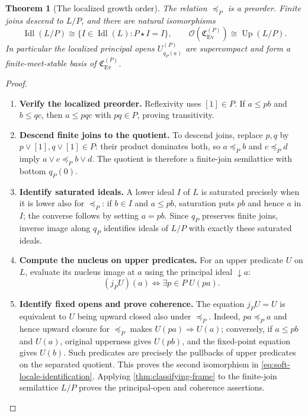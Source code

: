 \documentclass[11pt,a4paper]{article}
\numberwithin{algorithm}{section}
\numberwithin{equation}{section}
\newtheorem{theorem}{Theorem}[section]
\theoremstyle{definition}
\theoremstyle{remark}
\theoremstyle{plain}
\newcommand{\OO}{\mathcal O}
\newcommand{\Idl}{\operatorname{Idl}}
\newcommand{\Ev}{{\operatorname{Ev}}}
\newcommand{\Cplx}{\mathfrak C_{\Ev}}
\newcommand{\Up}{\operatorname{Up}}
\theoremstyle{definition}
\theoremstyle{plain}
\begin{document}
\begin{theorem}[The localized growth order]
\label{thm:localized-growth-order}
The relation $\preceq_P$ is a preorder. Finite joins descend to $L/P$,
and there are natural isomorphisms
\begin{equation}\label{eq:soft-locale-identification}
 \Idl(L/P)\cong\{I\in\Idl(L):P\star I=I\},\qquad
 \OO(\Cplx^{(P)})\cong\Up(L/P).
\end{equation}
In particular the localized principal opens
$U^{(P)}_{q_P(a)}$ are supercompact and form a
finite-meet-stable basis of $\Cplx^{(P)}$.
\end{theorem}
\begin{proof}\leavevmode
\begin{enumerate}[leftmargin=*,align=left]
\item \textbf{Verify the localized preorder.}
Reflexivity uses $[1]\in P$.  If $a\le pb$ and $b\le qc$,
then $a\le pqc$ with $pq\in P$, proving transitivity.

\item \textbf{Descend finite joins to the quotient.}
To descend joins, replace $p,q$ by $p\vee[1],q\vee[1]\in P$:
their product dominates both, so
$a\preceq_P b$ and $c\preceq_P d$ imply
$a\vee c\preceq_P b\vee d$.  The quotient is therefore a
finite-join semilattice with bottom $q_P(0)$.

\item \textbf{Identify saturated ideals.}
A lower ideal $I$ of $L$ is saturated precisely when it is
lower also for $\preceq_P$: if $b\in I$ and $a\le pb$,
saturation puts $pb$ and hence $a$ in $I$; the converse
follows by setting $a=pb$.  Since $q_P$ preserves finite
joins, inverse image along $q_P$ identifies ideals of $L/P$
with exactly these saturated ideals.

\item \textbf{Compute the nucleus on upper predicates.}
For an upper predicate $U$ on $L$, evaluate its nucleus image
at $a$ using the principal ideal $\downarrow a$:
\[
 (j_PU)(a)\iff\exists p\in P\;U(pa).
\]

\item \textbf{Identify fixed opens and prove coherence.}
The equation $j_PU=U$ is equivalent to $U$ being upward
closed also under $\preceq_P$.  Indeed, $pa\preceq_Pa$
and hence upward closure for $\preceq_P$ makes
$U(pa)\Rightarrow U(a)$; conversely, if $a\le pb$ and
$U(a)$, original upperness gives $U(pb)$, and the fixed-point
equation gives $U(b)$.  Such predicates are precisely the
pullbacks of upper predicates on the separated quotient.
This proves the second isomorphism in
\eqref{eq:soft-locale-identification}.  Applying
\cref{thm:classifying-frame} to the finite-join semilattice
$L/P$ proves the principal-open and coherence assertions.
\end{enumerate}
\end{proof}
\end{document}
